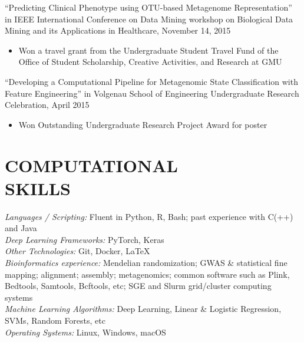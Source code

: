 \documentclass[margin, 10pt]{res} %
\begin{document}
\begin{resume}
``Predicting Clinical Phenotype using OTU-based Metagenome Representation'' in IEEE International Conference on Data Mining workshop on Biological Data Mining and its Applications in Healthcare, November 14, 2015
\begin{itemize} \itemsep -2pt %
\item Won a travel grant from the Undergraduate Student Travel Fund of the Office of Student Scholarship, Creative Activities, and Research at GMU
\end{itemize}

``Developing a Computational Pipeline for Metagenomic State Classification with Feature Engineering'' in Volgenau School of Engineering Undergraduate Research Celebration, April 2015
\begin{itemize} \itemsep -2pt %
\item Won Outstanding Undergraduate Research Project Award for poster
\end{itemize}



\section{COMPUTATIONAL \\ SKILLS} 

{\sl Languages / Scripting:} 
Fluent in Python, R, Bash; past experience with C(++) and Java\\
{\sl Deep Learning Frameworks:} PyTorch, Keras \\
{\sl Other Technologies:} Git, Docker, LaTeX \\
{\sl Bioinformatics experience:} Mendelian randomization; GWAS \& statistical fine mapping; alignment; assembly; metagenomics; common software such as Plink, Bedtools, Samtools, Bcftools, etc; SGE and Slurm grid/cluster computing systems \\
{\sl Machine Learning Algorithms:} Deep Learning, Linear \& Logistic Regression, SVMs, Random Forests, etc \\
{\sl Operating Systems:} Linux, Windows, macOS 



\end{resume}
\end{document}
